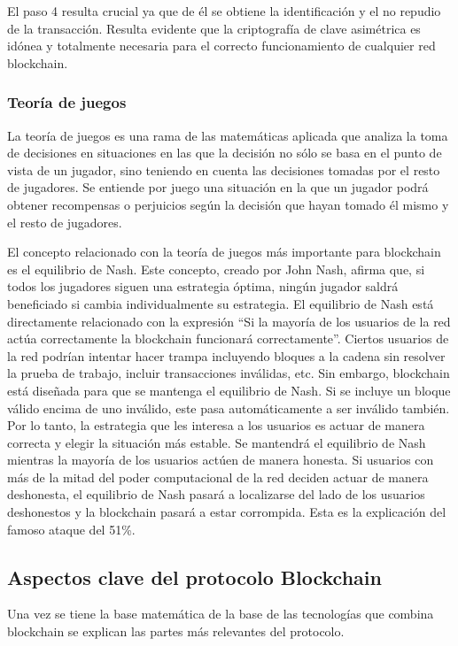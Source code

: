 El paso 4 resulta crucial ya que de él se obtiene la identificación y el no repudio de la transacción. Resulta evidente que la criptografía de clave asimétrica es idónea y totalmente necesaria para el correcto funcionamiento de cualquier red blockchain.

\subsubsection{Teoría de juegos}
La teoría de juegos es una rama de las matemáticas aplicada que analiza la toma de decisiones en situaciones en las que la decisión no sólo se basa en el punto de vista de un jugador, sino teniendo en cuenta las decisiones tomadas por el resto de jugadores. Se entiende por juego una situación en la que un jugador podrá obtener recompensas o perjuicios según la decisión que hayan tomado él mismo y el resto de jugadores. \newline

El concepto relacionado con la teoría de juegos más importante para blockchain es el equilibrio de Nash. Este concepto, creado por John Nash, afirma que, si todos los jugadores siguen una estrategia óptima, ningún jugador saldrá beneficiado si cambia individualmente su estrategia. El equilibrio de Nash está directamente relacionado con la expresión “Si la mayoría de los usuarios de la red actúa correctamente la blockchain funcionará correctamente”. Ciertos usuarios de la red podrían intentar hacer trampa incluyendo bloques a la cadena sin resolver la prueba de trabajo, incluir transacciones inválidas, etc. Sin embargo, blockchain está diseñada para que se mantenga el equilibrio de Nash. Si se incluye un bloque válido encima de uno inválido, este pasa automáticamente a ser inválido también. Por lo tanto, la estrategia que les interesa a los usuarios es actuar de manera correcta y elegir la situación más estable. Se mantendrá el equilibrio de Nash mientras la mayoría de los usuarios actúen de manera honesta. Si usuarios con más de la mitad del poder computacional de la red deciden actuar de manera deshonesta, el equilibrio de Nash pasará a localizarse del lado de los usuarios deshonestos y la blockchain pasará a estar corrompida. Esta es la explicación del famoso ataque del 51\%.

\subsection{Aspectos clave del protocolo Blockchain}
Una vez se tiene la base matemática de la base de las tecnologías que combina blockchain se explican las partes más relevantes del protocolo.

